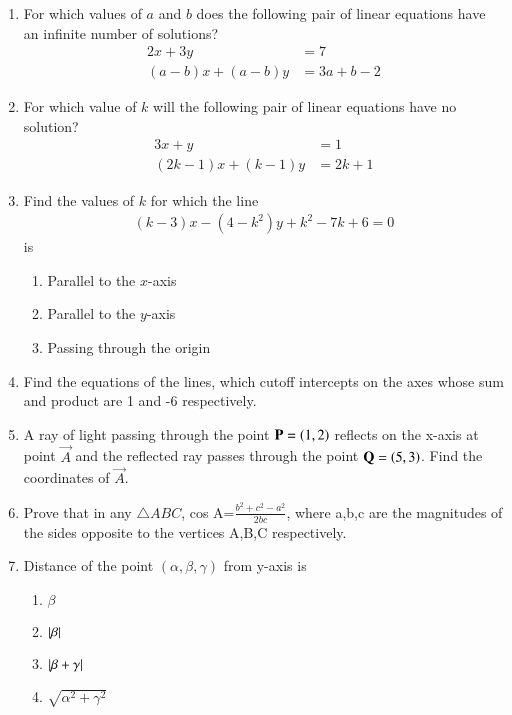 \begin{enumerate}[label=\thesubsection.\arabic*,ref=\thesubsection.\theenumi]
  \item For which values of $a$ and $b$ does the following pair of linear equations have an infinite number of solutions?
	\begin{align}
		2x+3y&=7\\
		(a-b)x+(a-b)y&=3a+b-2
	\end{align}
  \item For which value of $k$ will the following pair of linear equations have no solution?
	\begin{align}
		3x+y&=1\\
		(2k-1)x+(k-1)y&=2k+1
	\end{align}
\item Find the values of $k$ for which the line 
\begin{align}
(k-3)x-(4-k^2)y+k^2-7k+6=0 \label{eq:chapters/11/10/4/1/1}
\end{align}
is
\begin{enumerate}
\item Parallel to the $x$-axis
\item Parallel to the $y$-axis
\item Passing through the origin
\end{enumerate}
    \solution 
		
	\item Find the  equations of the lines, which cutoff intercepts on the axes  whose sum and product are 1 and -6 respectively.
\\
\solution
		
\item A ray of light passing through the point $\mathbf{P} = \left(1, 2\right)$ reflects on the x-axis at point $\vec{A}$ and the reflected ray passes through the point $\mathbf{Q} =\left(5, 3\right)$. Find the coordinates of $\vec{A}$.
\\
    \solution 
		
\item Prove that in any $\triangle{ABC}$, cos A=$\frac{b^2+c^2-a^2}{2bc}$, where a,b,c are the magnitudes of the sides opposite to the vertices A,B,C respectively.
\item Distance of the point $(\alpha, \beta, \gamma)$ from y-axis is
\begin{enumerate}
	\item $\beta$ 
	\item $\left\vert\beta\right\vert$
	\item $\left\vert\beta+\gamma\right\vert$
	\item $\sqrt{\alpha^2+\gamma^2}$

\end{enumerate}
\end{enumerate}
